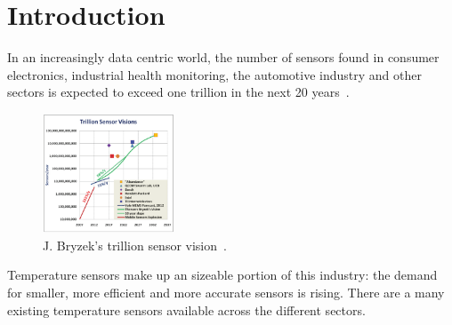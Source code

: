 \documentclass[a4paper,10pt,twocolumn]{article}
\begin{document}



\begin{small}
    \printnomenclature
\end{small}

\section{Introduction}

In an increasingly data centric world, the number of sensors found in
consumer electronics, industrial health monitoring, the automotive industry and
other sectors is expected to exceed one trillion in the next 20
years~\cite{bryzek2014emergence}.

\begin{figure}[h]
    \centering
    \includegraphics[width=0.35\textwidth]{img/trillion-sensors.png}
    \caption{J. Bryzek's trillion sensor vision~\cite{bryzek2014emergence}.}
    \label{fig:tsensors}
\end{figure}

Temperature sensors make up an sizeable portion of this industry: the demand for
smaller, more efficient and more accurate sensors is rising. There are a many
existing temperature sensors available across the different sectors.
\end{document}
